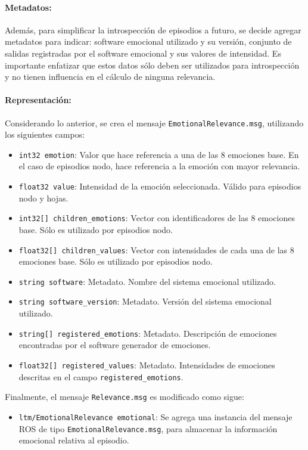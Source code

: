 \paragraph{Metadatos:}
Además, para simplificar la introspección de episodios a futuro, se decide agregar metadatos para indicar: software emocional utilizado y su versión, conjunto de salidas registradas por el software emocional y sus valores de intensidad. Es importante enfatizar que estos datos sólo deben ser utilizados para introspección y no tienen influencia en el cálculo de ninguna relevancia.

\paragraph{Representación:}
Considerando lo anterior, se crea el mensaje \texttt{EmotionalRelevance.msg}, utilizando los siguientes campos:
\begin{itemize}
\item \texttt{int32 emotion}: Valor que hace referencia a una de las 8 emociones base. En el caso de episodios nodo, hace referencia a la emoción con mayor relevancia.
\item \texttt{float32 value}: Intensidad de la emoción seleccionada. Válido para episodios nodo y hojas.
\item \texttt{int32[] children\_emotions}: Vector con identificadores de las 8 emociones base. Sólo es utilizado por episodios nodo.
\item \texttt{float32[] children\_values}: Vector con intensidades de cada una de las 8 emociones base. Sólo es utilizado por episodios nodo.
\item \texttt{string software}: Metadato. Nombre del sistema emocional utilizado.
\item \texttt{string software\_version}: Metadato. Versión del sistema emocional utilizado.
\item \texttt{string[] registered\_emotions}: Metadato. Descripción de emociones encontradas por el software generador de emociones. 
\item \texttt{float32[] registered\_values}: Metadato. Intensidades de emociones descritas en el campo \texttt{registered\_emotions}.
\end{itemize}


Finalmente, el mensaje \texttt{Relevance.msg} es modificado como sigue:
\begin{itemize}
	\item \texttt{ltm/EmotionalRelevance emotional}: Se agrega una instancia del mensaje ROS de tipo \texttt{EmotionalRelevance.msg}, para almacenar la información emocional relativa al episodio.
\end{itemize}


